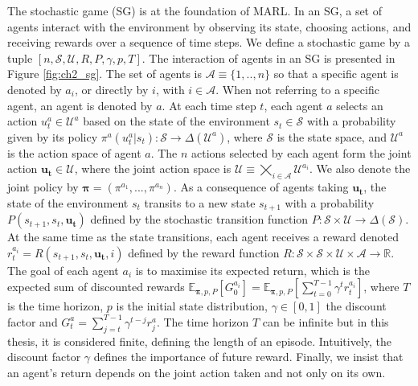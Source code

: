 The stochastic game (SG) \citep{stochasticGames} is at the foundation of MARL.
In an SG, a set of agents interact with the environment by observing its state, choosing actions, and receiving rewards over a sequence of time steps.
We define a stochastic game by a tuple $[n, \mathcal{S}, \mathcal{U}, R, P, \gamma, p, T]$.
The interaction of agents in an SG is presented in Figure \ref{fig:ch2_sg}.
The set of agents is $\mathcal{A} \equiv \{1,..,n\}$ so that a specific agent is denoted by $a_i$,  or directly by $i$, with $i \in \mathcal{A}$.
When not referring to a specific agent, an agent is denoted by $a$.
At each time step $t$, each agent $a$ selects an action $u_t^a \in \mathcal{U}^a$ based on the state of the environment $s_t \in \mathcal{S}$ with a probability given by its policy $\pi^a(u^a_t|s_t): \mathcal{S} \rightarrow \Delta(\mathcal{U}^a)$, where $\mathcal{S}$ is the state space, and $\mathcal{U}^a$ is the action space of agent $a$.
The $n$ actions selected by each agent form the joint action $\mathbf{u_t} \in \mathcal{U}$, where the joint action space is $\mathcal{U} \equiv \bigtimes_{i \in \mathcal{A}} \mathcal{U}^{a_i}$.
We also denote the joint policy by $\mathbf{\pi} = (\pi^{a_1},...,\pi^{a_n})$.
As a consequence of agents taking $\mathbf{u_t}$, the state of the environment $s_t$ transits to a new state $s_{t+1}$ with a probability $P(s_{t+1}, s_t, \mathbf{u_t})$ defined by the stochastic transition function $P:\mathcal{S} \times \mathcal{U} \rightarrow \Delta(\mathcal{S})$.
At the same time as the state transitions, each agent receives a reward denoted $r_t^{a_i} = R(s_{t+1}, s_t, \mathbf{u_t}, i)$ defined by the reward function $R: \mathcal{S} \times \mathcal{S} \times \mathcal{U} \times \mathcal{A} \rightarrow \mathbb{R}$.
The goal of each agent $a_i$ is to maximise its expected return, which is the expected sum of discounted rewards $\mathbb{E}_{\mathbf{\pi}, p, P}\left[ G_0^{a_i} \right] =\mathbb{E}_{\mathbf{\pi}, p, P}\left[ \sum_{t=0}^{T-1} \gamma^t r^{a_i}_t \right]$, where $T$ is the time horizon, $p$ is the initial state distribution, $\gamma \in [0, 1]$ the discount factor and $G^a_t= \sum_{j=t}^{T-1} \gamma^{t-j} r^a_{j}$.
The time horizon $T$ can be infinite but in this thesis, it is considered finite, defining the length of an episode.
Intuitively, the discount factor $\gamma$ defines the importance of future reward.
Finally, we insist that an agent's return depends on the joint action taken and not only on its own.

